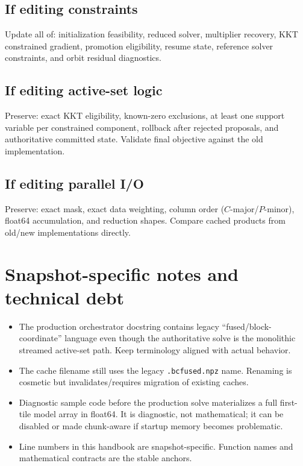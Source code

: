 \documentclass[10pt,a4paper]{article}
\newcommand{\code}[1]{\texttt{#1}}
\begin{document}
\subsection{If editing constraints}
Update all of: initialization feasibility, reduced solver, multiplier recovery, KKT constrained gradient, promotion eligibility, resume state, reference solver constraints, and orbit residual diagnostics.

\subsection{If editing active-set logic}
Preserve: exact KKT eligibility, known-zero exclusions, at least one support variable per constrained component, rollback after rejected proposals, and authoritative committed state. Validate final objective against the old implementation.

\subsection{If editing parallel I/O}
Preserve: exact mask, exact data weighting, column order ($C$-major/$P$-minor), float64 accumulation, and reduction shapes. Compare cached products from old/new implementations directly.

\section{Snapshot-specific notes and technical debt}
\begin{itemize}
\item The production orchestrator docstring contains legacy ``fused/block-coordinate'' language even though the authoritative solve is the monolithic streamed active-set path. Keep terminology aligned with actual behavior.
\item The cache filename still uses the legacy \code{.bcfused.npz} name. Renaming is cosmetic but invalidates/requires migration of existing caches.
\item Diagnostic sample code before the production solve materializes a full first-tile model array in float64. It is diagnostic, not mathematical; it can be disabled or made chunk-aware if startup memory becomes problematic.
\item Line numbers in this handbook are snapshot-specific. Function names and mathematical contracts are the stable anchors.
\end{itemize}
\end{document}
